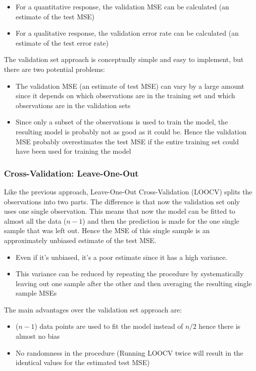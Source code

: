 {\begin{itemize}
	\item For a quantitative response, the validation MSE can be calculated (an estimate of the test MSE)
	\item For a qualitative response, the validation error rate can be calculated (an estimate of the test error rate)
\end{itemize}

The validation set approach is conceptually simple and easy to implement, but there are two potential problems:

\begin{itemize}
	\item The validation MSE (an estimate of test MSE) can vary by a large amount since it depends on which observations are in the training set and which observations are in the validation sets
	\item Since only a subset of the observations is used to train the model, the resulting model is probably not as good as it could be. Hence the validation MSE probably overestimates the test MSE if the entire training set could have been used for training the model
\end{itemize}

\subsubsection{Cross-Validation: Leave-One-Out}
Like the previous approach, Leave-One-Out Cross-Validation (LOOCV) splits the observations into two parts.
The difference is that now the validation set only uses one single observation.
This means that now the model can be fitted to almost all the data ($n-1$) and then the prediction is made for the one single sample that was left out.
Hence the MSE of this single sample is an approximately unbiased estimate of the test MSE.
\begin{itemize}
	\item Even if it's unbiased, it's a poor estimate since it has a high variance.
	\item This variance can be reduced by repeating the procedure by systematically leaving out one sample after the other and then averaging the resulting single sample MSEs
\end{itemize}
The main advantages over the validation set approach are:
\begin{itemize}
	\item ($n-1$) data points are used to fit the model instead of $n/2$ hence there is almost no bias
	\item No randomness in the procedure (Running LOOCV twice will result in the identical values for the estimated test MSE)
\end{itemize}

}
